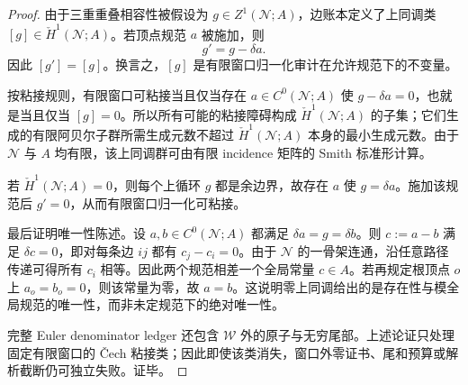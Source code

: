 \begin{proof}
由于三重重叠相容性被假设为 \(g\in Z^1(\mathcal N;A)\)，边账本定义了上同调类 \([g]\in\check H^1(\mathcal N;A)\)。若顶点规范 \(a\) 被施加，则
\[
g' = g-\delta a.
\]
因此 \([g']=[g]\)。换言之，\([g]\) 是有限窗口归一化审计在允许规范下的不变量。

按粘接规则，有限窗口可粘接当且仅当存在 \(a\in C^0(\mathcal N;A)\) 使 \(g-\delta a=0\)，也就是当且仅当 \([g]=0\)。所以所有可能的粘接障碍构成 \(\check H^1(\mathcal N;A)\) 的子集；它们生成的有限阿贝尔子群所需生成元数不超过 \(\check H^1(\mathcal N;A)\) 本身的最小生成元数。由于 \(\mathcal N\) 与 \(A\) 均有限，该上同调群可由有限 incidence 矩阵的 Smith 标准形计算。

若 \(\check H^1(\mathcal N;A)=0\)，则每个上循环 \(g\) 都是余边界，故存在 \(a\) 使 \(g=\delta a\)。施加该规范后 \(g'=0\)，从而有限窗口归一化可粘接。

最后证明唯一性陈述。设 \(a,b\in C^0(\mathcal N;A)\) 都满足 \(\delta a=g=\delta b\)。则 \(c:=a-b\) 满足 \(\delta c=0\)，即对每条边 \(ij\) 都有 \(c_j-c_i=0\)。由于 \(\mathcal N\) 的一骨架连通，沿任意路径传递可得所有 \(c_i\) 相等。因此两个规范相差一个全局常量 \(c\in A\)。若再规定根顶点 \(o\) 上 \(a_o=b_o=0\)，则该常量为零，故 \(a=b\)。这说明零上同调给出的是存在性与模全局规范的唯一性，而非未定规范下的绝对唯一性。

完整 Euler denominator ledger 还包含 \(\mathcal W\) 外的原子与无穷尾部。上述论证只处理固定有限窗口的 \v Cech 粘接类；因此即使该类消失，窗口外零证书、尾和预算或解析截断仍可独立失败。证毕。
\end{proof}
